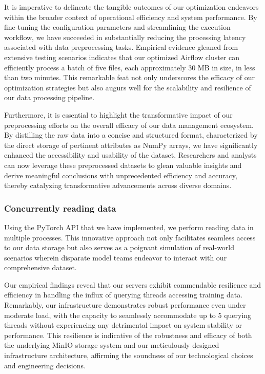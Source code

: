 It is imperative to delineate the tangible outcomes of our optimization
endeavors within the broader context of operational efficiency and system
performance. By fine-tuning the configuration parameters and streamlining the
execution workflow, we have succeeded in substantially reducing the processing
latency associated with data preprocessing tasks. Empirical evidence gleaned
from extensive testing scenarios indicates that our optimized Airflow cluster
can efficiently process a batch of five files, each approximately 30 MB in size,
in less than two minutes. This remarkable feat not only underscores the efficacy
of our optimization strategies but also augurs well for the scalability and
resilience of our data processing pipeline.

Furthermore, it is essential to highlight the transformative impact of our
preprocessing efforts on the overall efficacy of our data management ecosystem.
By distilling the raw data into a concise and structured format, characterized
by the direct storage of pertinent attributes as NumPy arrays, we have
significantly enhanced the accessibility and usability of the dataset.
Researchers and analysts can now leverage these preprocessed datasets to glean
valuable insights and derive meaningful conclusions with unprecedented
efficiency and accuracy, thereby catalyzing transformative advancements across
diverse domains.


\subsubsection{Concurrently reading data}
Using the PyTorch API that we have implemented, we perform reading data in
multiple processes. This innovative approach not only facilitates seamless
access to our data storage but also serves as a poignant simulation of
real-world scenarios wherein disparate model teams endeavor to interact with our
comprehensive dataset.

Our empirical findings reveal that our servers exhibit commendable resilience
and efficiency in handling the influx of querying threads accessing training
data. Remarkably, our infrastructure demonstrates robust performance even under
moderate load, with the capacity to seamlessly accommodate up to 5 querying
threads without experiencing any detrimental impact on system stability or
performance. This resilience is indicative of the robustness and efficacy of
both the underlying MinIO storage system and our meticulously designed
infrastructure architecture, affirming the soundness of our technological
choices and engineering decisions.

